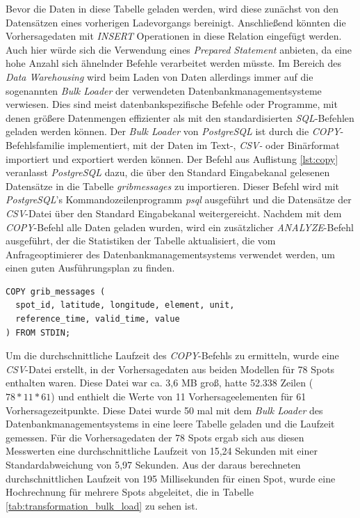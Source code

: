 Bevor die Daten in diese Tabelle geladen werden, wird diese zunächst
von den Datensätzen eines vorherigen Ladevorgangs
bereinigt. Anschließend könnten die Vorhersagedaten mit
\textit{INSERT} Operationen in diese Relation eingefügt werden. Auch
hier würde sich die Verwendung eines \textit{Prepared Statement}
anbieten, da eine hohe Anzahl sich ähnelnder Befehle verarbeitet
werden müsste. Im Bereich des \textit{Data Warehousing} wird beim
Laden von Daten allerdings immer auf die sogenannten \textit{Bulk
  Loader} der verwendeten Datenbankmanagementsysteme verwiesen. Dies
sind meist datenbankspezifische Befehle oder Programme, mit denen
größere Datenmengen effizienter als mit den standardisierten
\textit{SQL}-Befehlen geladen werden können. Der \textit{Bulk Loader}
von \textit{PostgreSQL} ist durch die \textit{COPY}-Befehlsfamilie
implementiert, mit der Daten im Text-, \textit{CSV-} oder Binärformat
importiert und exportiert werden können. Der Befehl aus Auflistung
\ref{lst:copy} veranlasst \textit{PostgreSQL} dazu, die über den
Standard Eingabekanal gelesenen Datensätze in die Tabelle
\textit{grib\textunderscore messages} zu importieren. Dieser Befehl
wird mit \textit{PostgreSQL}'s Kommandozeilenprogramm \textit{psql}
ausgeführt und die Datensätze der \textit{CSV}-Datei über den Standard
Eingabekanal weitergereicht. Nachdem mit dem \textit{COPY}-Befehl alle
Daten geladen wurden, wird ein zusätzlicher \textit{ANALYZE}-Befehl
ausgeführt, der die Statistiken der Tabelle aktualisiert, die vom
Anfrageoptimierer des Datenbankmanagementsystems verwendet werden, um
einen guten Ausführungsplan zu finden.

\begin{lstlisting}[captionpos=b, caption=Befehl zum Import von Datensätzen in \textit{PostgreSQL}, label=lst:copy]
COPY grib_messages (
  spot_id, latitude, longitude, element, unit, 
  reference_time, valid_time, value
) FROM STDIN;
\end{lstlisting}

Um die durchschnittliche Laufzeit des \textit{COPY}-Befehls zu
ermitteln, wurde eine \textit{CSV}-Datei erstellt, in der
Vorhersagedaten aus beiden Modellen für 78 Spots enthalten
waren. Diese Datei war ca. 3,6 MB groß, hatte 52.338 Zeilen ($78 * 11
* 61$) und enthielt die Werte von 11 Vorhersageelementen für 61
Vorhersagezeitpunkte. Diese Datei wurde 50 mal mit dem \textit{Bulk
  Loader} des Datenbankmanagementsystems in eine leere Tabelle geladen
und die Laufzeit gemessen. Für die Vorhersagedaten der 78 Spots ergab
sich aus diesen Messwerten eine durchschnittliche Laufzeit von 15,24
Sekunden mit einer Standardabweichung von 5,97 Sekunden. Aus der
daraus berechneten durchschnittlichen Laufzeit von 195 Millisekunden
für einen Spot, wurde eine Hochrechnung für mehrere Spots abgeleitet,
die in Tabelle \ref{tab:transformation_bulk_load} zu sehen ist.

